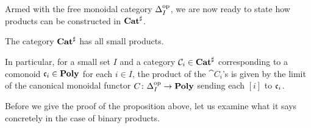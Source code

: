 \documentclass[Book-Poly]{subfiles}
\begin{document}
Armed with the free monoidal category $\Delta_I^{\textnormal{op}}$, we are now ready to state how products can be constructed in $\mathbf{Cat}^\sharp$.

\begin{proposition}\label{prop.sharp_products}
The category $\mathbf{Cat}^\sharp$ has all small products.

In particular, for a small set $I$ and a category $\mathcal{C}_i \in \mathbf{Cat}^\sharp$ corresponding to a comonoid $\mathfrak{c}_i \in \mathbf{Poly}$ for each $i \in I$, the product of the $\cat{C}_i$'s is given by the limit of the canonical monoidal functor $C \colon \Delta_I^{\textnormal{op}} \to \mathbf{Poly}$ sending each $[i]$ to $\mathfrak{c}_i$.
\end{proposition}

Before we give the proof of the proposition above, let us examine what it says concretely in the case of binary products.
\end{document}
